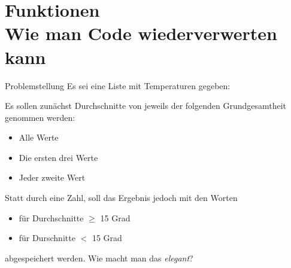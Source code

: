 \section{Funktionen \\ \footnotesize Wie man Code wiederverwerten kann}
\begin{frame}
\begin{block}{Problemstellung}
	\vspace{2pt}
	Es sei eine Liste mit Temperaturen gegeben: 
	
	
	\pause
	Es sollen zunächst Durchschnitte von jeweils der folgenden Grundgesamtheit genommen werden: 
	\begin{itemize}
		\item Alle Werte
		\item Die ersten drei Werte
		\item Jeder zweite Wert
	\end{itemize}
\pause 
	Statt durch eine Zahl, soll das Ergebnis jedoch mit den Worten  
	\begin{itemize}
		\item {} für Durchschnitte $\geq$ 15 Grad
		\item {} für Durschnitte $<$ 15 Grad
	\end{itemize}
	abgespeichert werden. 
	\pause 
	\vspace{8pt}
	Wie macht man das \emph{elegant}? 
\end{block}
\end{frame}
